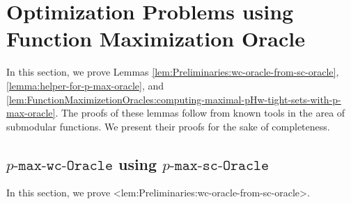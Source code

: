 \documentclass{article}
\def\Cref#1{<#1>}%
\newcommand{\functionMaximizationOracle}[1]{\ensuremath{{#1}\text{-}\mathtt{max}\text{-}\mathtt{wc}\text{-}\mathtt{Oracle}}\xspace}
\newcommand{\functionMaximizationOracleStrongCover}[1]{\ensuremath{{#1}\text{-}\mathtt{max}\text{-}\mathtt{sc}\text{-}\mathtt{Oracle}}\xspace}
\begin{document}
\section{Optimization Problems using Function Maximization Oracle}\label{appendix:sec:Function-Maximization-Oracles}
In this section, we prove Lemmas 
\ref{lem:Preliminaries:wc-oracle-from-sc-oracle}, \ref{lemma:helper-for-p-max-oracle}, and \ref{lem:FunctionMaximizetionOracles:computing-maximal-pHw-tight-sets-with-p-max-oracle}. The proofs of these lemmas follow from known tools in the area of submodular functions. We present their proofs for the sake of completeness. 



\subsection{\functionMaximizationOracle{p} using \functionMaximizationOracleStrongCover{p}}\label{sec:wc-oracle-from-sc-oracle}
In this section, we prove \Cref{lem:Preliminaries:wc-oracle-from-sc-oracle}. 
\lemmaWCoraclefromSCoracle*
\end{document}
